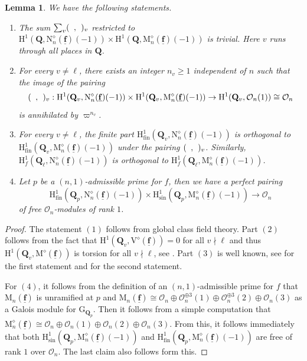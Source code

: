 \documentclass[10pt]{amsart}
\numberwithin{equation}{section}
\theoremstyle{plain}
\newtheorem{lemma}[theorem]{Lemma}
\numberwithin{equation}{section}
\theoremstyle{definition}
\theoremstyle{remark}
\def\triplef{\underline{\mathbf{f}}}
\def\calO{\mathcal{O}}
\def\QQ{\mathbf{Q}}
\def\rmG{\mathrm{G}}
\def\rmH{\mathrm{H}}
\def\rmM{\mathrm{M}}
\def\rmN{\mathrm{N}}
\def\rmV{\mathrm{V}}
\begin{document}
\begin{lemma}\label{sel-pairing}
We have the following statements.
\begin{enumerate}
\item The sum $\sum_{v}(\hphantom{a},\hphantom{b})_{v}$ restricted to $\rmH^{1}(\QQ, \rmN^{\diamond}_{n}(\triplef)(-1))\times \rmH^{1}(\QQ,\rmM^{\diamond}_{n}(\triplef)(-1))$ is trivial. Here $v$ runs through all places in $\QQ$. 
\item  For every $v\neq \ell$, there exists an integer $n_{v}\geq 1$ independent of $n$ such that the image of the pairing 
\begin{equation*}
(\hphantom{a}, \hphantom{b})_{v}: \rmH^{1}(\QQ_{v}, \rmN^{\diamond}_{n}(\triplef)(-1))\times \rmH^{1}(\QQ_{v},\rmM^{\diamond}_{n}(\triplef)(-1)) \rightarrow \rmH^{1}(\QQ_{v}, \calO_{n}(1))\cong \calO_{n}
\end{equation*} 
is annihilated by $\varpi^{n_{v}}$.
\item For every $v\neq \ell$, the finite part $\rmH^{1}_{\mathrm{fin}}(\QQ_{v}, \rmN^{\diamond}_{n}(\triplef)(-1))$ is orthogonal to $\rmH^{1}_{\mathrm{fin}}(\QQ_{v},\rmM^{\diamond}_{n}(\triplef)(-1))$ under the pairing $(\hphantom{a}, \hphantom{b})_{v}$. Similarly,  $\rmH^{1}_{f}(\QQ_{\ell}, \rmN^{\diamond}_{n}(\triplef)(-1))$  is orthogonal to $\rmH^{1}_{f}(\QQ_{\ell},\rmM^{\diamond}_{n}(\triplef)(-1))$.
\item Let $p$ be a $(n, 1)$-admissible prime for $f$, then we have a perfect pairing 
\begin{equation*}
\rmH^{1}_{\mathrm{fin}}(\QQ_{p}, \rmN^{\diamond}_{n}(\triplef)(-1))\times \rmH^{1}_{\mathrm{sin}}(\QQ_{p},\rmM^{\diamond}_{n}(\triplef)(-1))\rightarrow \calO_{n}
\end{equation*}
of free $\calO_{n}$-modules of rank $1$. 
\end{enumerate}
\end{lemma}
\begin{proof}
The statement $(1)$ follows from global class field theory.  Part $(2)$ follows from the fact that $\rmH^{1}(\QQ_{v}, \rmV^{\diamond}(\triplef))=0$ for all $v\nmid \ell$ and thus $\rmH^{1}(\QQ_{v},\rmM^{\diamond}(\triplef))$ is torsion for all $v\nmid \ell$, see  \cite[Lemma 4.3]{Liu-HZ}. Part $(3)$ is well known, see \cite[Theorem 2.17(e)]{DDT} for the first statement and \cite[Lemma 4.8]{Liu-HZ} for the second statement. 

For $(4)$, it follows from the definition of an $(n, 1)$-admissible prime for $f$ that $\rmM_{n}(\triplef)$ is unramified at $p$ and
$\rmM_{n}(\triplef)\cong\calO_{n}\oplus \calO^{\oplus 3}_{n}(1) \oplus \calO^{\oplus 3}_{n}(2) \oplus\calO_{n}(3)$
as a Galois module for $\rmG_{\QQ_{p}}$. Then it follows from a simple computation that $\rmM^{\diamond}_{n}(\triplef)\cong\calO_{n}\oplus \calO_{n}(1) \oplus \calO_{n}(2) \oplus\calO_{n}(3)$. From this, it follows immediately that both $\rmH^{1}_{\mathrm{sin}}(\QQ_{p},\rmM^{\diamond}_{n}(\triplef)(-1))$ and $\rmH^{1}_{\mathrm{fin}}(\QQ_{p},\rmM^{\diamond}_{n}(\triplef)(-1))$ are free of rank $1$ over $\calO_{n}$. The last claim also follows form this. 
\end{proof}
\end{document}
